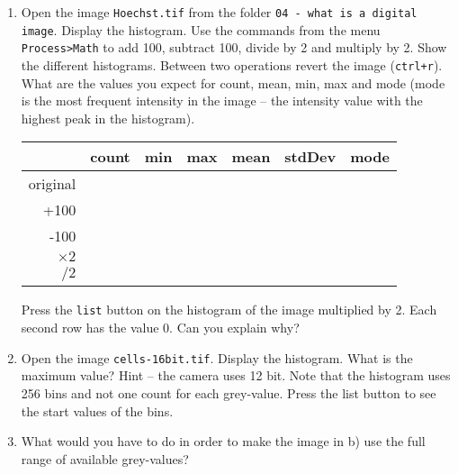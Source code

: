 \begin{enumerate}
\item Open the image \texttt{Hoechst.tif} from the folder \texttt{04 - what is a digital image}. Display the histogram. Use the commands from the menu \texttt{Process>Math} to add 100, subtract 100, divide by 2 and multiply by 2. Show the different histograms. Between two operations
revert the image (\texttt{ctrl+r}). What are the values you expect for count, mean, min, max and
mode (mode is the most frequent intensity in the image – the intensity value with the highest
peak in the histogram).

\begin{tabular}{|r|c|c|c|c|c|c|}
   \hline 
    & count & min & max &  mean & stdDev & mode \\
    \hline 
    original&&&&&& \\
   \hline
   +100&&&&&& \\
   \hline
   -100&&&&&& \\
   \hline
   $\times2$&&&&&& \\
   \hline
   $/2$&&&&&& \\
   \hline
\end{tabular}

Press the \texttt{list} button on the histogram of the image multiplied by 2. Each second row has the value 0. Can you explain why?

\fbox{
	\begin{minipage}{\linewidth}
		\hfill\vspace{2cm}
	\end{minipage}
	}
	
\item Open the image \texttt{cells-16bit.tif}. Display the histogram. What is the maximum value? Hint -- the camera uses 12 bit. Note that the histogram uses 256 bins and not one count for each
grey-value. Press the list button to see the start values of the bins.

\fbox{
	\begin{minipage}{\linewidth}
		\hfill\vspace{1cm}
	\end{minipage}
	}
	
\item What would you have to do in order to make the image in b) use the full range of available
grey-values?

\fbox{
	\begin{minipage}{\linewidth}
		\hfill\vspace{2cm}
	\end{minipage}
	}
	

\end{enumerate}
